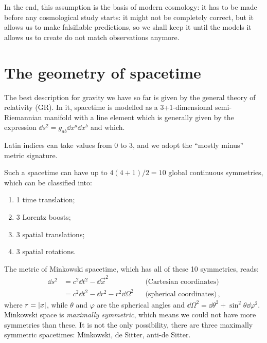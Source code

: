 \documentclass[main.tex]{subfiles}
\begin{document}

In the end, this assumption is the basis of modern cosmology: it has to be made before any cosmological study starts: it might not be completely correct, but it allows us to make falsifiable predictions, so we shall keep it until the models it allows us to create do not match observations anymore.

\section{The geometry of spacetime}

The best description for gravity we have so far is given by the general theory of relativity (GR).
In it, spacetime is modelled as a 3+1-dimensional semi-Riemannian manifold with a line element which is  generally given by the expression \(\dd{s^2} = g_{ab} \dd{x^a} \dd{x^b} \) and which.

Latin indices can take values from 0 to 3, and we adopt the ``mostly minus'' metric signature.

Such a spacetime can have up to \(4(4+1) / 2 = 10\) global continuous symmetries, which can be classified into:
\begin{enumerate}[label=(\alph*)]
  \item 1 time translation; \label{item:time-translation}
  \item 3 Lorentz boosts; \label{item:lorentz-boost}
  \item 3 spatial translations; \label{item:spatial-translation}
  \item 3 spatial rotations. \label{item:spatial-rotation}
\end{enumerate}

The metric of Minkowski spacetime, which has all of these 10 symmetries, reads: 
%
\begin{subequations}
\begin{align}
\dd{s^2} &= c^2 \dd{t^2} - \dd{\vec{x}^2} && \text{(Cartesian coordinates)} \\
&= c^2 \dd{t^2} - \dd{r^2} - r^2 \dd{\Omega^2} && \text{(spherical coordinates)}
\,,
\end{align}
\end{subequations}
%
where \(r = \abs{x}\), while \(\theta \) and \(\varphi \) are the spherical angles and \(\dd{\Omega^2} = \dd{\theta^2} + \sin^2\theta \dd{\varphi^2 }\).\\
Minkowski space is \emph{maximally symmetric}, which means we could not have more symmetries than these. It is not the only possibility, there are three maximally symmetric spacetimes: Minkowski, de Sitter, anti-de Sitter.
\end{document}
